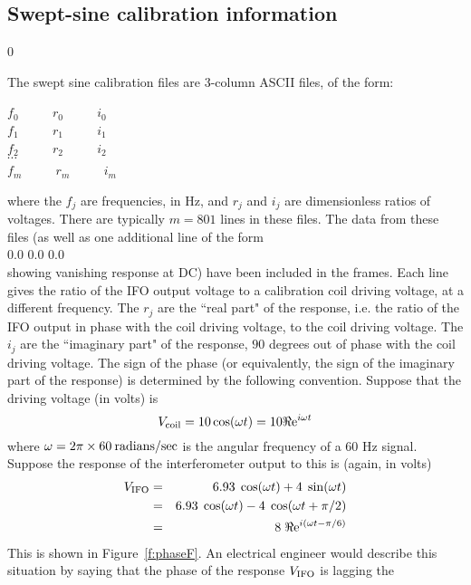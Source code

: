  

\clearpage

\subsection{Swept-sine calibration information}
\setcounter{equation}0

The swept sine calibration files are 3-column ASCII files, of the form:
\begin{center}
$f_0$ $\qquad$ $r_0$ $\qquad$ $i_0$ \\
$f_1$ $\qquad$ $r_1$ $\qquad$ $i_1$ \\
$f_2$ $\qquad$ $r_2$ $\qquad$ $i_2$ \\
$\cdots$\\
$f_m$ $\qquad$ $r_m$ $\qquad$ $i_m$
\end{center}
where the $f_j$ are frequencies, in Hz, and $r_j$ and $i_j$ are
dimensionless ratios of voltages. 
There are typically $m=801$ lines in
these files.  
The data from these files (as well as one additional line of the
form\\
0.0  0.0  0.0\\
showing vanishing response at DC) have been included in the frames.
Each line gives the ratio of the IFO output voltage to a
calibration coil driving voltage, at a different frequency.  The $r_j$
are the ``real part" of the response, i.e. the ratio of the IFO output
in phase with the coil driving voltage, to the coil driving voltage.
The $i_j$ are the ``imaginary part" of the response, $90$ degrees out
of phase with the coil driving voltage.  The sign of the phase (or
equivalently, the sign of the imaginary part of the response) is
determined by the following convention.  Suppose that the driving
voltage (in volts) is
\begin{equation}
\label{e:calibrate1F}
V_{\rm coil} = 10 \cos( \omega t) = 10 \Re {\rm e}^{i \omega t}
\end{equation}
where $\omega= 2 \pi \times 60 \> {\rm radians/sec}$ is the angular frequency of
a 60 Hz signal.  Suppose the
response of the interferometer output to this is (again, in volts)
\begin{eqnarray}
\label{e:calibrate2F}
V_{\rm IFO} &=& 6.93 \; \cos(\omega t) + 4\; \sin(\omega t)\cr
 &=& 6.93 \; \cos(\omega t) - 4\; \cos(\omega t + \pi/2) \cr
 &=& 8 \; \Re {\rm e}^{i (\omega t - \pi/6)}
\end{eqnarray}
This is shown in Figure~\ref{f:phaseF}. 
An electrical engineer would describe this
situation by saying that the phase of the response $V_{\rm IFO}$ is lagging the
